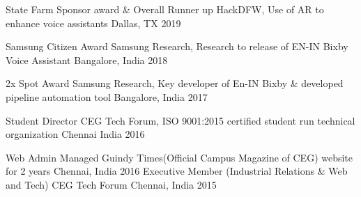 



\begin{cvhonors}

  \cvhonor
    {State Farm Sponsor award \& Overall Runner up} %
    {HackDFW, Use of AR to enhance voice assistants} %
    {Dallas, TX} %
    {2019} %


  \cvhonor
    {Samsung Citizen Award} %
    {Samsung Research, Research to release of EN-IN Bixby Voice Assistant} %
    {Bangalore, India} %
    {2018} %

  \cvhonor
    {2x Spot Award} %
    {Samsung Research, Key developer of En-IN Bixby \& developed pipeline automation tool} %
    {Bangalore, India} %
    {2017} %

  \cvhonor
    {Student Director} %
    {CEG Tech Forum, ISO 9001:2015 certified student run technical organization} %
    {Chennai India} %
    {2016} %

  \cvhonor
  {Web Admin} %
  {Managed Guindy Times(Official Campus Magazine of CEG) website for 2 years} %
  {Chennai, India} %
  {2016} %
%
  \cvhonor
    {Executive Member (Industrial Relations \& Web and Tech)} %
    {CEG Tech Forum} %
    {Chennai, India} %
    {2015} %
%
%

\end{cvhonors}
